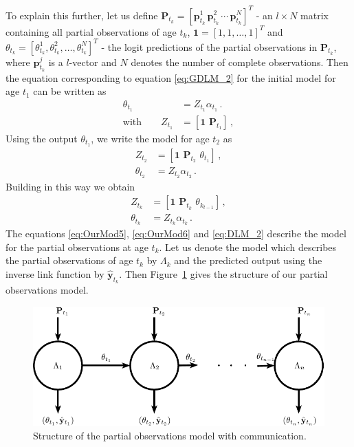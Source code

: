 \documentclass[a4paper,11pt]{article}
\begin{document}
To explain this further, let us define $\bm{P}_{t_k} = \left[ \bm{p}^1_{t_k}\, \bm{p}^2_{t_k}\, \cdots \, \bm{p}^N_{t_k} \right]^T$ - an $l \times N$ matrix containing all partial observations of age $t_k$, $\bm{1} = \left[ 1, 1, \dots, 1\right]^T$ and $\theta_{t_k} = \left[\theta^1_{t_k}, \theta^2_{t_k}, \dots, \theta^N_{t_k} \right]^T$ - the logit predictions of the partial observations in $\bm{P}_{t_k}$, where $\bm{p}^j_{t_k}$ is a $l$-vector and $N$ denotes the number of complete observations. %
Then the equation corresponding to equation \eqref{eq:GDLM_2} for the initial model for age $t_1$ can be written as
\begin{align}
	\theta_{t_1} & = Z_{t_1} \alpha_{t_1} \, . \label{eq:OurMod2}                     \\
	\text{with} \qquad
       Z_{t_1} & = [ \bm{1} \, \, \bm{P}_{t_1} ] \, , \label{eq:OurMod1}
\end{align}
Using the output $\theta_{t_1}$, we write the model for age $t_2$ as
\begin{align}
	Z_{t_2}      & = [ \bm{1} \, \, \bm{P}_{t_2} \, \, \theta_{t_1}] \, ,\label{eq:OurMod3} \\
	\theta_{t_2} & = Z_{t_2} \alpha_{t_2} \, . \label{eq:OurMod4}
\end{align}
Building in this way we obtain
\begin{align}
	Z_{t_k}      & = [ \bm{1} \, \, \bm{P}_{t_k} \, \, \theta_{k_{t-1}}] \, , \label{eq:OurMod5} \\
	\theta_{t_k} & = Z_{t_k} \alpha_{t_k} \, . \label{eq:OurMod6}
\end{align}
The equations \eqref{eq:OurMod5}, \eqref{eq:OurMod6} and \eqref{eq:DLM_2} describe the model for the partial observations at age $t_k$. Let us denote the model which describes the partial observations of age $t_k$ by $\Lambda_k$ and the predicted output using the inverse link function by $\hat{\bm{y}}_{t_k}$. Then Figure~\ref{fig:PODLM} gives the structure of our partial observations model.

\begin{figure}[!hb]
	\centering
	\includegraphics[clip=true,scale=0.8]{./Graphics/Lots_of_circles_3.pdf}
	\caption{Structure of the partial observations model with communication.}
	\label{fig:PODLM}
\end{figure}
\end{document}
